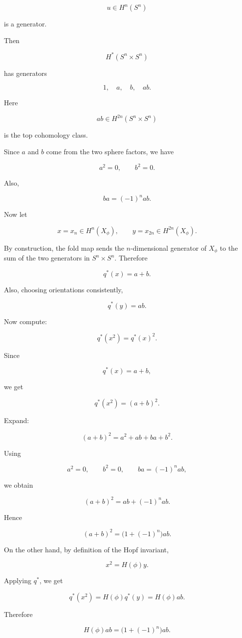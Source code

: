 \begin{solution}
\[
u\in H^n(S^n)
\]

is a generator.

Then

\[
H^*(S^n\times S^n)
\]

has generators

\[
1,\quad a,\quad b,\quad ab.
\]

Here

\[
ab\in H^{2n}(S^n\times S^n)
\]

is the top cohomology class.

Since \(a\) and \(b\) come from the two sphere factors, we have

\[
a^2=0,
\qquad
b^2=0.
\]

Also,

\[
ba=(-1)^n ab.
\]

Now let

\[
x=x_n\in H^n(X_\phi),
\qquad
y=x_{2n}\in H^{2n}(X_\phi).
\]

By construction, the fold map sends the \(n\)-dimensional generator of \(X_\phi\) to the sum of the two generators in \(S^n\times S^n\). Therefore

\[
q^*(x)=a+b.
\]

Also, choosing orientations consistently,

\[
q^*(y)=ab.
\]

Now compute:

\[
q^*(x^2)=q^*(x)^2.
\]

Since

\[
q^*(x)=a+b,
\]

we get

\[
q^*(x^2)=(a+b)^2.
\]

Expand:

\[
(a+b)^2=a^2+ab+ba+b^2.
\]

Using

\[
a^2=0,
\qquad
b^2=0,
\qquad
ba=(-1)^n ab,
\]

we obtain

\[
(a+b)^2
=
ab+(-1)^n ab.
\]

Hence

\[
(a+b)^2
=
\bigl(1+(-1)^n\bigr)ab.
\]

On the other hand, by definition of the Hopf invariant,

\[
x^2=H(\phi)y.
\]

Applying \(q^*\), we get

\[
q^*(x^2)
=
H(\phi)q^*(y)
=
H(\phi)ab.
\]

Therefore

\[
H(\phi)ab
=
\bigl(1+(-1)^n\bigr)ab.
\]


\end{solution}

